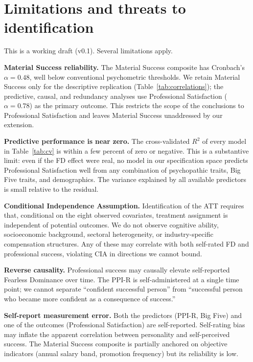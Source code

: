 \documentclass[11pt,a4paper]{article}
\begin{document}
\section{Limitations and threats to identification}
\label{sec:limits}

This is a working draft (v0.1). Several limitations apply.

\textbf{Material Success reliability.} The Material Success
composite has Cronbach's $\alpha = 0.48$, well below conventional
psychometric thresholds. We retain Material Success only for the
descriptive replication (Table~\ref{tab:correlations}); the predictive,
causal, and redundancy analyses use Professional Satisfaction
($\alpha=0.78$) as the primary outcome. This restricts the scope of
the conclusions to Professional Satisfaction and leaves Material
Success unaddressed by our extension.

\textbf{Predictive performance is near zero.} The cross-validated
$R^2$ of every model in Table~\ref{tab:cv} is within a few percent
of zero or negative. This is a substantive limit: even if the FD
effect were real, no model in our specification space predicts
Professional Satisfaction well from any combination of psychopathic
traits, Big Five traits, and demographics. The variance explained by
all available predictors is small relative to the residual.

\textbf{Conditional Independence Assumption.} Identification of the
ATT requires that, conditional on the eight observed covariates,
treatment assignment is independent of potential outcomes. We do not
observe cognitive ability, socioeconomic background, sectoral
heterogeneity, or industry-specific compensation structures. Any of
these may correlate with both self-rated FD and professional success,
violating CIA in directions we cannot bound.

\textbf{Reverse causality.} Professional success may causally
elevate self-reported Fearless Dominance over time. The PPI-R is
self-administered at a single time point; we cannot separate
``confident successful person'' from ``successful person who
became more confident as a consequence of success.''

\textbf{Self-report measurement error.} Both the predictors (PPI-R,
Big Five) and one of the outcomes (Professional Satisfaction) are
self-reported. Self-rating bias may inflate the apparent correlation
between personality and self-perceived success. The Material Success
composite is partially anchored on objective indicators (annual
salary band, promotion frequency) but its reliability is low.
\end{document}

